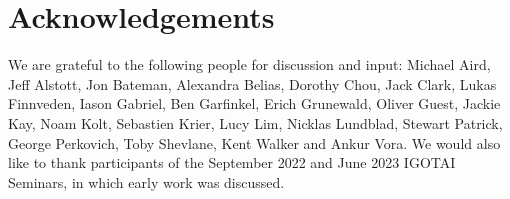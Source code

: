 \documentclass[12pt]{article}
\begin{document}
\section*{Acknowledgements}
We are grateful to the following people for discussion and input: Michael Aird, Jeff Alstott, Jon Bateman, Alexandra Belias, Dorothy Chou, Jack Clark, Lukas Finnveden, Iason Gabriel, Ben Garfinkel, Erich Grunewald, Oliver Guest, Jackie Kay, Noam Kolt, Sebastien Krier, Lucy Lim, Nicklas Lundblad, Stewart Patrick, George Perkovich, Toby Shevlane, Kent Walker and Ankur Vora.
We would also like to thank participants of the September 2022 and June 2023 IGOTAI Seminars, in which
early work was discussed.



\end{document}
